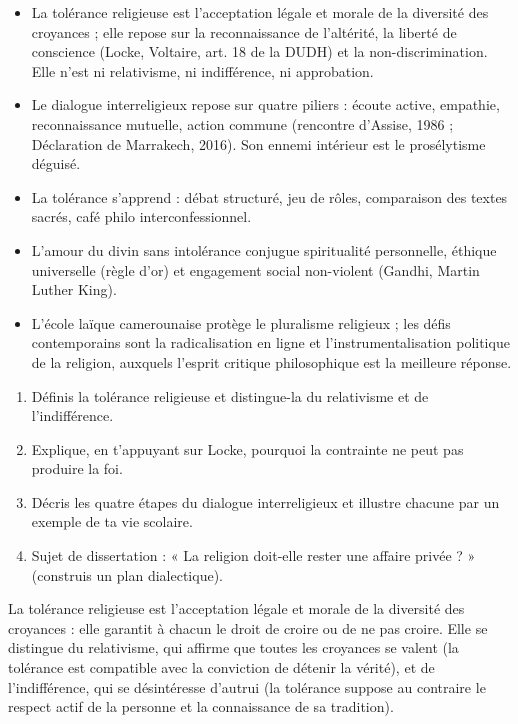 \documentclass[11pt]{article}
\newcommand{\cle}[1]{{\popxbold\color{popdark}#1}}
\begin{document}
\begin{aretenir}
\begin{itemize}
\item La \cle{tolérance religieuse} est l'acceptation légale et morale de la diversité des croyances ; elle repose sur la reconnaissance de l'altérité, la liberté de conscience (Locke, Voltaire, art. 18 de la DUDH) et la non-discrimination. Elle n'est ni relativisme, ni indifférence, ni approbation.
\item Le \cle{dialogue interreligieux} repose sur quatre piliers : écoute active, empathie, reconnaissance mutuelle, action commune (rencontre d'Assise, 1986 ; Déclaration de Marrakech, 2016). Son ennemi intérieur est le prosélytisme déguisé.
\item La tolérance s'apprend : débat structuré, jeu de rôles, comparaison des textes sacrés, café philo interconfessionnel.
\item L'\cle{amour du divin sans intolérance} conjugue spiritualité personnelle, éthique universelle (règle d'or) et engagement social non-violent (Gandhi, Martin Luther King).
\item L'école laïque camerounaise protège le pluralisme religieux ; les défis contemporains sont la radicalisation en ligne et l'instrumentalisation politique de la religion, auxquels l'esprit critique philosophique est la meilleure réponse.
\end{itemize}
\end{aretenir}

\begin{exercice}
\begin{enumerate}
\item Définis la tolérance religieuse et distingue-la du relativisme et de l'indifférence.
\item Explique, en t'appuyant sur Locke, pourquoi la contrainte ne peut pas produire la foi.
\item Décris les quatre étapes du dialogue interreligieux et illustre chacune par un exemple de ta vie scolaire.
\item Sujet de dissertation : « La religion doit-elle rester une affaire privée ? » (construis un plan dialectique).
\end{enumerate}
\end{exercice}

\begin{corrige}[Exercice 1]
La tolérance religieuse est l'acceptation légale et morale de la diversité des croyances : elle garantit à chacun le droit de croire ou de ne pas croire. Elle se distingue du relativisme, qui affirme que toutes les croyances se valent (la tolérance est compatible avec la conviction de détenir la vérité), et de l'indifférence, qui se désintéresse d'autrui (la tolérance suppose au contraire le respect actif de la personne et la connaissance de sa tradition).
\end{corrige}
\end{document}
